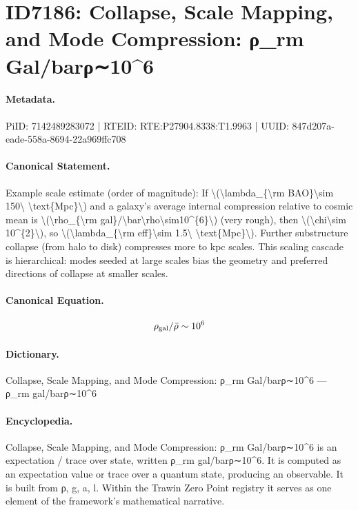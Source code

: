 \section*{ID7186: Collapse, Scale Mapping, and Mode Compression: ρ\_rm Gal/barρ∼10\textasciicircum{}6}
\paragraph{Metadata.}
PiID: 7142489283072 | RTEID: RTE:P27904.8338:T1.9963 | UUID: 847d207a-eade-558a-8694-22a969ffc708

\paragraph{Canonical Statement.}
Example scale estimate (order of magnitude): If \textbackslash{}(\textbackslash{}lambda\_\{\textbackslash{}rm BAO\}\textbackslash{}sim 150\textbackslash{} \textbackslash{}text\{Mpc\}\textbackslash{}) and a galaxy's average internal compression relative to cosmic mean is \textbackslash{}(\textbackslash{}rho\_\{\textbackslash{}rm gal\}/\textbackslash{}bar\textbackslash{}rho\textbackslash{}sim10\textasciicircum{}\{6\}\textbackslash{}) (very rough), then \textbackslash{}(\textbackslash{}chi\textbackslash{}sim 10\textasciicircum{}\{2\}\textbackslash{}), so \textbackslash{}(\textbackslash{}lambda\_\{\textbackslash{}rm eff\}\textbackslash{}sim 1.5\textbackslash{} \textbackslash{}text\{Mpc\}\textbackslash{}). Further substructure collapse (from halo to disk) compresses more to kpc scales. This scaling cascade is hierarchical: modes seeded at large scales bias the geometry and preferred directions of collapse at smaller scales.

\paragraph{Canonical Equation.}
\[
\rho_{\rm gal}/\bar\rho\sim10^{6}
\]

\paragraph{Dictionary.}
Collapse, Scale Mapping, and Mode Compression: ρ\_rm Gal/barρ∼10\textasciicircum{}6 — ρ\_rm gal/barρ∼10\textasciicircum{}6

\paragraph{Encyclopedia.}
Collapse, Scale Mapping, and Mode Compression: ρ\_rm Gal/barρ∼10\textasciicircum{}6 is an expectation / trace over state, written ρ\_rm gal/barρ∼10\textasciicircum{}6. It is computed as an expectation value or trace over a quantum state, producing an observable. It is built from ρ, g, a, l. Within the Trawin Zero Point registry it serves as one element of the framework's mathematical narrative.

